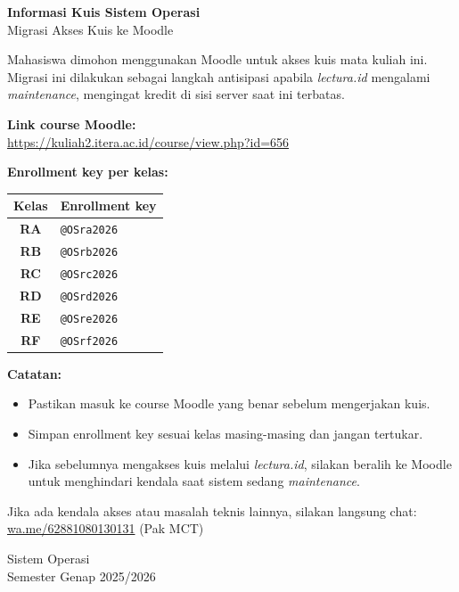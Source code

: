 \documentclass[12pt,a4paper]{article}
\begin{document}
\begin{center}
{\LARGE \textbf{Informasi Kuis Sistem Operasi}}\\[0.4em]
{\large Migrasi Akses Kuis ke Moodle}
\end{center}

Mahasiswa dimohon menggunakan Moodle untuk akses kuis mata kuliah ini. Migrasi ini dilakukan sebagai langkah antisipasi apabila \textit{lectura.id} mengalami \textit{maintenance}, mengingat kredit di sisi server saat ini terbatas.

\textbf{Link course Moodle:}\\
\href{https://kuliah2.itera.ac.id/course/view.php?id=656}{https://kuliah2.itera.ac.id/course/view.php?id=656}

\textbf{Enrollment key per kelas:}

\begin{center}
\begin{tabular}{>{\bfseries}c l}
\toprule
Kelas & Enrollment key \\
\midrule
RA & \texttt{@OSra2026} \\
RB & \texttt{@OSrb2026} \\
RC & \texttt{@OSrc2026} \\
RD & \texttt{@OSrd2026} \\
RE & \texttt{@OSre2026} \\
RF & \texttt{@OSrf2026} \\
\bottomrule
\end{tabular}
\end{center}

\textbf{Catatan:}
\begin{itemize}
    \item Pastikan masuk ke course Moodle yang benar sebelum mengerjakan kuis.
    \item Simpan enrollment key sesuai kelas masing-masing dan jangan tertukar.
    \item Jika sebelumnya mengakses kuis melalui \textit{lectura.id}, silakan beralih ke Moodle untuk menghindari kendala saat sistem sedang \textit{maintenance}.
\end{itemize}

Jika ada kendala akses atau masalah teknis lainnya, silakan langsung chat:\\
\href{https://wa.me/62881080130131}{wa.me/62881080130131} (Pak MCT)

\vfill
\begin{flushright}
Sistem Operasi\\
Semester Genap 2025/2026
\end{flushright}
\end{document}
